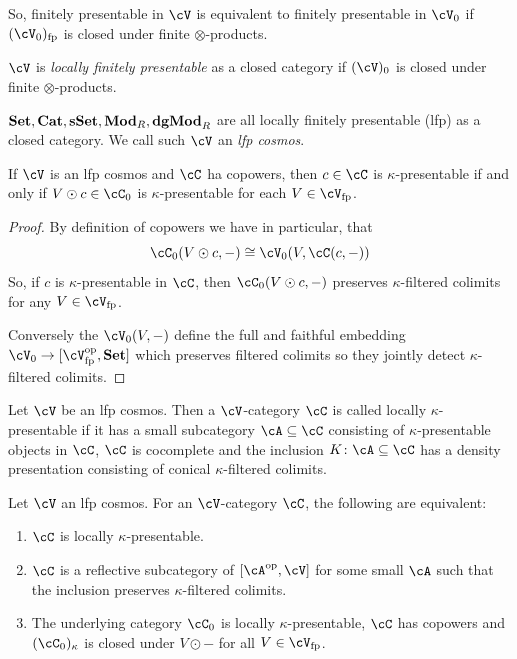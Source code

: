 \documentclass[a4paper,11pt,oneside,openany]{scrbook}
\begin{document}
So, finitely presentable in $ \cV $ is equivalent to finitely presentable in $ \cV_0 $ if $ (\cV_0)_{\text{fp}} $ is closed under finite $ \otimes $-products.

\begin{defn}
	$ \cV $ is \emph{locally finitely presentable} as a closed category if $ (\cV)_0 $ is closed under finite $ \otimes $-products.
\end{defn}

\begin{exmp}
	$ {\normalfont\textbf{Set}},{\normalfont\textbf{Cat}},{\normalfont\textbf{sSet}},{\normalfont\textbf{Mod}}_R,{\normalfont\textbf{dgMod}}_R $ are all locally finitely presentable (lfp) as a closed category. We call such $ \cV $ an \emph{lfp cosmos}.
\end{exmp}
\begin{prop}
	If $ \cV $ is an lfp cosmos and $ \cC $ ha copowers, then $ c\in \cC $ is $ \kappa $-presentable if and only if $ V\odot c \in \cC_0 $ is $ \kappa $-presentable for each $ V \in \cV_{\text{fp}} $.
\end{prop}
\begin{proof}
	By definition of copowers we have in particular, that
	\begin{displaymath}
		\cC_0(V \odot c , -) \iso \cV_0 (V , \cC(c,-))
	\end{displaymath}
	So, if $ c $ is $ \kappa $-presentable in $ \cC $, then $ \cC_0(V\odot c, -) $ preserves $ \kappa $-filtered colimits for any $ V \in \cV_{\text{fp}} $.

	Conversely the $ \cV_0(V,-) $ define the full and faithful embedding $ \cV_0 \to [\cV ^{\op} _{\text{fp}} , \Set ] $ which preserves filtered colimits so they jointly detect $ \kappa $-filtered colimits.
\end{proof}
\begin{defn}
	Let $ \cV $ be an lfp  cosmos. Then a $ \cV $-category $ \cC $ is called locally $ \kappa $-presentable if it has a small subcategory $ \cA \subseteq\cC  $ consisting of $ \kappa $-presentable objects in $ \cC $, $ \cC $ is cocomplete and the inclusion $ K \from \cA \subseteq\cC  $ has a density presentation consisting of conical $ \kappa $-filtered colimits.
\end{defn}
\begin{thm}
	Let $ \cV $ an lfp cosmos.
	For an $ \cV $-category $ \cC $, the following are equivalent:
	\begin{enumerate}[label=\arabic*)]
		\item
		      $ \cC $ is locally $ \kappa $-presentable.
		\item
		      $ \cC $ is a reflective subcategory of $ [\cA^{\op}, \cV] $ for some small $ \cA $ such that the inclusion preserves $ \kappa $-filtered colimits.\item
		      The underlying category $ \cC_0 $ is locally $ \kappa $-presentable, $ \cC  $ has copowers and $ (\cC_0)_{\kappa}  $ is closed under $ V\odot - $ for all $ V \in \cV_{\text{fp}} $.
	\end{enumerate}
\end{thm}
\end{document}
